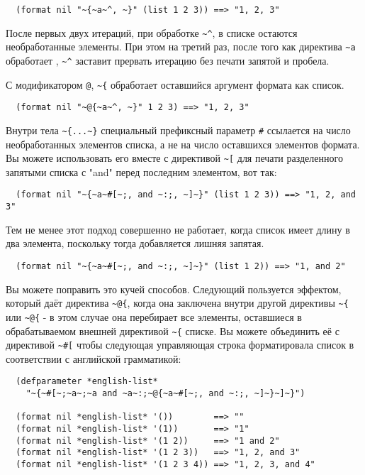\begin{verbatim}
  (format nil "~{~a~^, ~}" (list 1 2 3)) ==> "1, 2, 3"
\end{verbatim}

После первых двух итераций, при обработке \lstinline!~^!, в списке остаются необработанные
элементы. При этом на третий раз, после того как директива \lstinline!~a! обработает
, \lstinline!~^! заставит  прервать итерацию без печати запятой и
пробела.

С модификатором \lstinline!@!, \lstinline!~{! обработает оставшийся аргумент формата как список.

\begin{verbatim}
  (format nil "~@{~a~^, ~}" 1 2 3) ==> "1, 2, 3"
\end{verbatim}

Внутри тела \lstinline!~{...~}! специальный префиксный параметр \lstinline!#! ссылается на число необработанных элементов списка, а
не на число оставшихся элементов формата. Вы можете использовать его вместе с директивой \lstinline!~[! для печати
разделенного запятыми списка с "and" перед последним элементом, вот так:

\begin{verbatim}
  (format nil "~{~a~#[~;, and ~:;, ~]~}" (list 1 2 3)) ==> "1, 2, and 3"
\end{verbatim}

Тем не менее этот подход совершенно не работает, когда список имеет длину в два элемента,
поскольку тогда добавляется лишняя запятая.

\begin{verbatim}
  (format nil "~{~a~#[~;, and ~:;, ~]~}" (list 1 2)) ==> "1, and 2"
\end{verbatim}

Вы можете поправить это кучей способов. Следующий пользуется эффектом, который даёт директива \lstinline!~@{!, когда она
заключена внутри другой директивы \lstinline!~{! или \lstinline!~@{! - в этом случае она перебирает все элементы, оставшиеся в
обрабатываемом внешней директивой \lstinline!~{! списке. Вы можете объединить её с директивой \lstinline!~#[! чтобы следующая
управляющая строка форматировала список в соответствии с английской грамматикой:

\begin{verbatim}
  (defparameter *english-list*
    "~{~#[~;~a~;~a and ~a~:;~@{~a~#[~;, and ~:;, ~]~}~]~}")

  (format nil *english-list* '())        ==> ""
  (format nil *english-list* '(1))       ==> "1"
  (format nil *english-list* '(1 2))     ==> "1 and 2"
  (format nil *english-list* '(1 2 3))   ==> "1, 2, and 3"
  (format nil *english-list* '(1 2 3 4)) ==> "1, 2, 3, and 4"
\end{verbatim}


